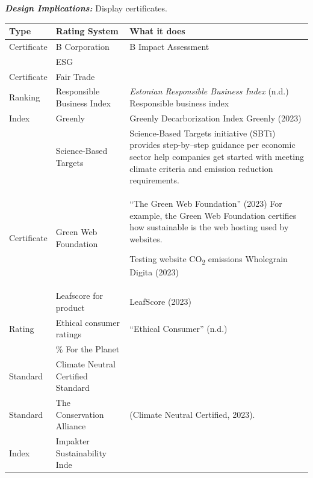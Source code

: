 \documentclass[
  letterpaper,
  DIV=11,
  numbers=noendperiod]{scrartcl}
\begin{document}
\textbf{\emph{Design Implications:}} Display certificates.

\begin{longtable}[]{@{}
  >{\raggedright\arraybackslash}p{}
  >{\raggedright\arraybackslash}p{}
  >{\raggedright\arraybackslash}p{}@{}}
\toprule\noalign{}
\begin{minipage}[b]{\linewidth}\raggedright
Type
\end{minipage} & \begin{minipage}[b]{\linewidth}\raggedright
Rating System
\end{minipage} & \begin{minipage}[b]{\linewidth}\raggedright
What it does
\end{minipage} \\
\midrule\noalign{}
\endhead
\bottomrule\noalign{}
\endlastfoot
Certificate & B Corporation & B Impact Assessment \\
& ESG & \\
Certificate & Fair Trade & \\
Ranking & Responsible Business Index & \emph{Estonian {Responsible
Business Index}} (n.d.) Responsible business index \\
Index & Greenly & Greenly Decarborization Index Greenly (2023) \\
& Science-Based Targets & Science-Based Targets initiative (SBTi)
provides step-by--step guidance per economic sector help companies get
started with meeting climate criteria and emission reduction
requirements. \\
Certificate & Green Web Foundation & {``The {Green Web Foundation}''}
(2023) For example, the Green Web Foundation certifies how sustainable
is the web hosting used by websites.

Testing website CO\textsubscript{2} emissions Wholegrain Digita
(2023) \\
& Leafscore for product & LeafScore (2023) \\
Rating & Ethical consumer ratings & {``Ethical {Consumer}''} (n.d.) \\
& 1\% For the Planet & \\
Standard & Climate Neutral Certified Standard & \\
Standard & The Conservation Alliance & (Climate Neutral Certified,
2023). \\
Index & Impakter Sustainability Inde & \\
\end{longtable}
\end{document}
